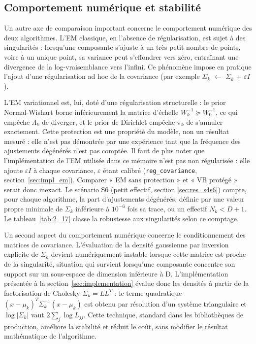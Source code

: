 \subsection{Comportement numérique et stabilité}\label{sec:comportement_numerique_et_stabilite}
Un autre axe de comparaison important concerne le comportement numérique des deux algorithmes. L'EM classique, en l'absence de régularisation, est sujet à des singularités : lorsqu'une composante s'ajuste à un très petit nombre de points, voire à un unique point, sa variance peut s'effondrer vers zéro, entraînant une divergence de la log-vraisemblance vers l'infini. Ce phénomène impose en pratique l'ajout d'une régularisation ad hoc de la covariance (par exemple $\Sigma _{k}$ $\leftarrow $ $\Sigma _{k}$ + $\varepsilon I$).

L'EM variationnel est, lui, doté d'une régularisation structurelle : le prior Normal-Wishart borne inférieurement la matrice d'échelle $W_k^{-1} \succeq W_0^{-1}$, ce qui empêche $\Lambda_k$ de diverger, et le prior de Dirichlet empêche $\pi_k$ de s'annuler exactement. Cette protection est une propriété du modèle, non un résultat mesuré : elle n'est pas démontrée par une expérience tant que la fréquence des ajustements dégénérés n'est pas comptée. Il faut de plus noter que l'implémentation de l'EM utilisée dans ce mémoire n'est pas non régularisée : elle ajoute $\varepsilon I$ à chaque covariance, $\varepsilon$ étant calibré (\texttt{reg\_covariance}, section~\ref{sec:impl_em}). Comparer « EM sans protection » et « VB protégé » serait donc inexact. Le scénario S6 (petit effectif, section \ref{sec:res_s4s6}) compte, pour chaque algorithme, la part d'ajustements dégénérés, définie par une valeur propre minimale de $\Sigma_k$ inférieure à $10^{-6}$ fois sa trace, ou un effectif $N_k < D+1$. Le tableau~\ref{tab:2_17} classe la robustesse aux singularités selon ce comptage.

Un second aspect du comportement numérique concerne le conditionnement des matrices de covariance. L'évaluation de la densité gaussienne par inversion explicite de $\Sigma _{k}$ devient numériquement instable lorsque cette matrice est proche de la singularité, situation qui survient lorsqu'une composante concentre son support sur un sous-espace de dimension inférieure à D. L'implémentation présentée à la section~\ref{sec:implementation} évalue donc les densités à partir de la factorisation de Cholesky $\Sigma _{k} = LL^{T}$ : le terme quadratique $(x-\mu _{k})^{T}\Sigma _{k}^{-1}(x-\mu _{k})$ est obtenu par résolution d'un système triangulaire et $\log |\Sigma _{k}|$ vaut $2\sum _{j}\log L_{jj}$. Cette technique, standard dans les bibliothèques de production, améliore la stabilité et réduit le coût, sans modifier le résultat mathématique de l'algorithme.


